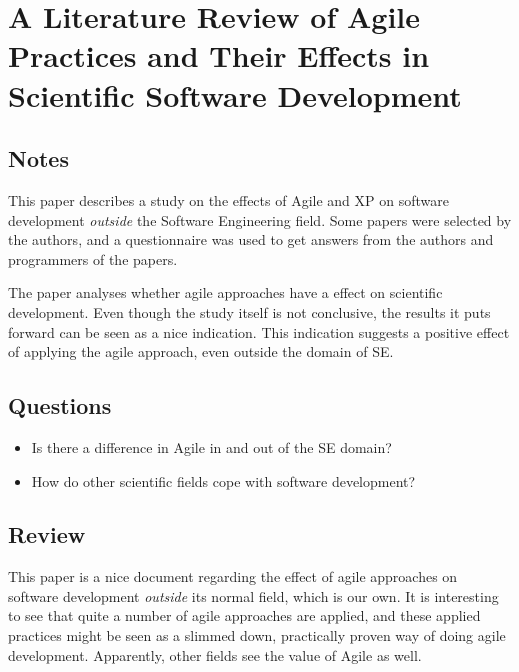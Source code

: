 \chapter{A Literature Review of Agile Practices and Their Effects in Scientific Software Development \cite{recentagile}}
\section{Notes}
This paper describes a study on the effects of Agile and XP on software development \emph{outside} the Software Engineering field. 
Some papers were selected by the authors, and a questionnaire was used to get answers from the authors and programmers of the papers. 

The paper analyses whether agile approaches have a effect on scientific development. 
Even though the study itself is not conclusive, the results it puts forward can be seen as a nice indication. 
This indication suggests a positive effect of applying the agile approach, even outside the domain of SE.

\section{Questions}
\begin{itemize}
  \item Is there a difference in Agile in and out of the SE domain?
  \item How do other scientific fields cope with software development?
\end{itemize}

\section{Review}
This paper is a nice document regarding the effect of agile approaches on software development \emph{outside} its normal field, which is our own. 
It is interesting to see that quite a number of agile approaches are applied, and these applied practices might be seen as a slimmed down, practically proven way of doing agile development. 
Apparently, other fields see the value of Agile as well.
